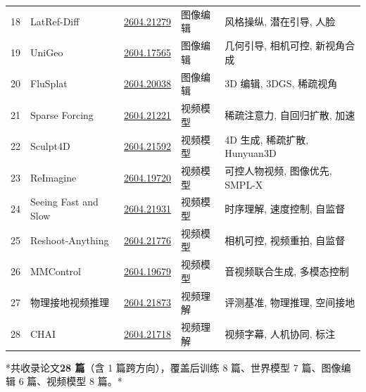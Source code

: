 \begin{longtable}{p{0.7cm}p{2.5cm}p{2.6cm}p{2.3cm}p{5.0cm}}
18 & LatRef-Diff & \href{https://arxiv.org/abs/2604.21279}{2604.21279} & 图像编辑 & 风格操纵, 潜在引导, 人脸 \\
19 & UniGeo & \href{https://arxiv.org/abs/2604.17565}{2604.17565} & 图像编辑 & 几何引导, 相机可控, 新视角合成 \\
20 & FluSplat & \href{https://arxiv.org/abs/2604.20038}{2604.20038} & 图像编辑 & 3D 编辑, 3DGS, 稀疏视角 \\
21 & Sparse Forcing & \href{https://arxiv.org/abs/2604.21221}{2604.21221} & 视频模型 & 稀疏注意力, 自回归扩散, 加速 \\
22 & Sculpt4D & \href{https://arxiv.org/abs/2604.21592}{2604.21592} & 视频模型 & 4D 生成, 稀疏扩散, Hunyuan3D \\
23 & ReImagine & \href{https://arxiv.org/abs/2604.19720}{2604.19720} & 视频模型 & 可控人物视频, 图像优先, SMPL-X \\
24 & Seeing Fast and Slow & \href{https://arxiv.org/abs/2604.21931}{2604.21931} & 视频模型 & 时序理解, 速度控制, 自监督 \\
25 & Reshoot-Anything & \href{https://arxiv.org/abs/2604.21776}{2604.21776} & 视频模型 & 相机可控, 视频重拍, 自监督 \\
26 & MMControl & \href{https://arxiv.org/abs/2604.19679}{2604.19679} & 视频模型 & 音视频联合生成, 多模态控制 \\
27 & 物理接地视频推理 & \href{https://arxiv.org/abs/2604.21873}{2604.21873} & 视频理解 & 评测基准, 物理推理, 空间接地 \\
28 & CHAI & \href{https://arxiv.org/abs/2604.21718}{2604.21718} & 视频理解 & 视频字幕, 人机协同, 标注 \\
\bottomrule
\end{longtable}
\normalsize

*共收录论文\textbf{28 篇}（含 1 篇跨方向），覆盖后训练 8 篇、世界模型 7 篇、图像编辑 6 篇、视频模型 8 篇。*
